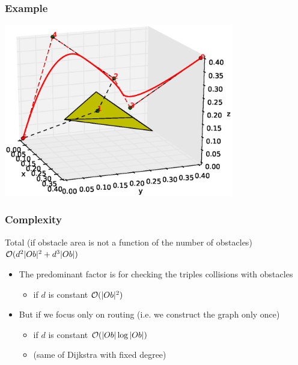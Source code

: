 \begin{frame}
  \frametitle{Example}
  \begin{center}
    \includegraphics[width=0.75\textwidth, trim=110 30 50 50, clip]{img/screenFinal2.eps}
  \end{center}
\end{frame}

\begin{frame}
  \frametitle{Complexity}
  \begin{block}{Total (if obstacle area is not a function of the
      number of obstacles)}
    \alert{$\mathcal{O}(d^2|Ob|^2+d^3|Ob|)$}\pause
  \end{block}
  \begin{itemize}
  \item The predominant factor is for checking the triples
    collisions with obstacles\pause
    \begin{itemize}
    \item if $d$ is constant \alert{$\mathcal{O}(|Ob|^2)$}\pause
    \end{itemize}
  \item But if we focus only on routing (i.e. we construct the graph
    only once)\pause
    \begin{itemize}
    \item if $d$ is constant \alert{$\mathcal{O}(|Ob|\log|Ob|)$}\pause
    \item (same of Dijkstra with fixed degree)
    \end{itemize}
  \end{itemize}
\end{frame}

